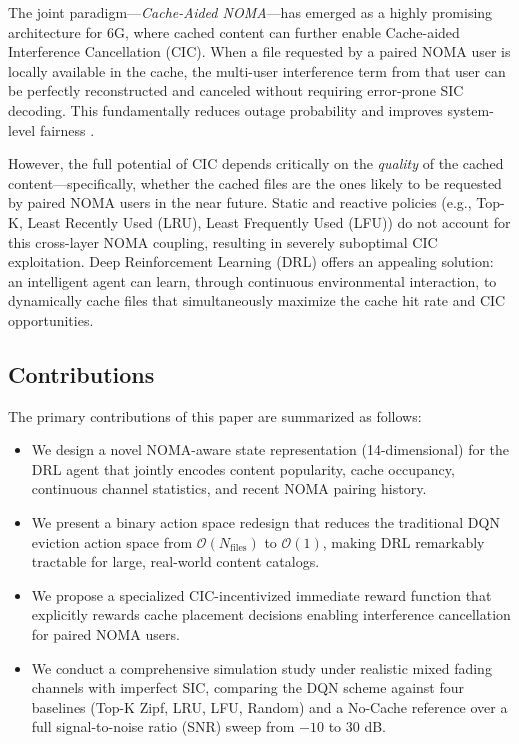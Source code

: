 \documentclass[conference]{IEEEtran}
\begin{document}
The joint paradigm---\textit{Cache-Aided NOMA}---has emerged as a highly promising architecture for 6G, where cached content can further enable Cache-aided Interference Cancellation (CIC). When a file requested by a paired NOMA user is locally available in the cache, the multi-user interference term from that user can be perfectly reconstructed and canceled without requiring error-prone SIC decoding. This fundamentally reduces outage probability and improves system-level fairness \cite{b_survey_bepari, b_cao_joint}.

However, the full potential of CIC depends critically on the \textit{quality} of the cached content---specifically, whether the cached files are the ones likely to be requested by paired NOMA users in the near future. Static and reactive policies (e.g., Top-K, Least Recently Used (LRU), Least Frequently Used (LFU)) do not account for this cross-layer NOMA coupling, resulting in severely suboptimal CIC exploitation. Deep Reinforcement Learning (DRL) offers an appealing solution: an intelligent agent can learn, through continuous environmental interaction, to dynamically cache files that simultaneously maximize the cache hit rate and CIC opportunities.

\subsection*{Contributions}
The primary contributions of this paper are summarized as follows:
\begin{itemize}
    \item We design a novel NOMA-aware state representation (14-dimensional) for the DRL agent that jointly encodes content popularity, cache occupancy, continuous channel statistics, and recent NOMA pairing history.
    \item We present a binary action space redesign that reduces the traditional DQN eviction action space from $\mathcal{O}(N_{\text{files}})$ to $\mathcal{O}(1)$, making DRL remarkably tractable for large, real-world content catalogs.
    \item We propose a specialized CIC-incentivized immediate reward function that explicitly rewards cache placement decisions enabling interference cancellation for paired NOMA users.
    \item We conduct a comprehensive simulation study under realistic mixed fading channels with imperfect SIC, comparing the DQN scheme against four baselines (Top-K Zipf, LRU, LFU, Random) and a No-Cache reference over a full signal-to-noise ratio (SNR) sweep from $-10$ to $30$ dB.
\end{itemize}
\end{document}
